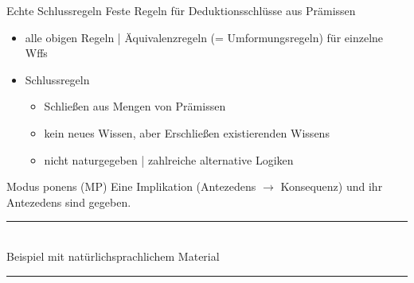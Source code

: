 \begin{frame}
  {Echte Schlussregeln}
  \onslide<+->
  \onslide<+->
  Feste Regeln für \alert{Deduktionsschlüsse aus Prämissen}\\
  \Halbzeile
  \begin{itemize}[<+->]
    \item alle obigen Regeln | \alert{Äquivalenzregeln} (= Umformungsregeln) für einzelne Wffs
    \item Schlussregeln
      \begin{itemize}[<+->]
        \item Schließen aus \alert{Mengen von Prämissen}
        \item kein neues Wissen, aber \alert{Erschließen existierenden Wissens}
        \item nicht naturgegeben | zahlreiche \alert{alternative Logiken}
      \end{itemize}
  \end{itemize}
\end{frame}

\begin{frame}
  {Modus ponens (MP)}
  \onslide<+->
  \onslide<+->
  Eine \alert{Implikation} (Antezedens $\rightarrow$ Konsequenz) und \alert{ihr Antezedens} sind gegeben.\\
  \onslide<+->
  \Zeile
  \rule{3em}{0em}\\
  \Doppelzeile 
  \onslide<+->
  Beispiel mit natürlichsprachlichem Material\\
  \Zeile
  \rule{3em}{0em}
\end{frame}

